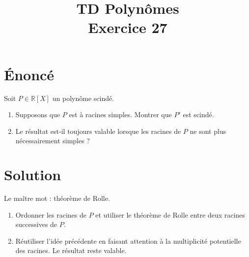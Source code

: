 \documentclass[french]{article}
\title{TD Polynômes \\ Exercice 27}
\date{}
\newcommand{\R}{\mathbb{R}}
\begin{document}
\maketitle

\section{Énoncé}
Soit $P \in \R[X]$ un polynôme scindé.
\begin{enumerate}
	\item Supposons que $P$ est à racines simples. Montrer que $P'$ est scindé.
	\item Le résultat est-il toujours valable lorsque les racines de $P$ ne sont plus nécessairement simples ?
\end{enumerate}
\section{Solution}
Le maître mot : théorème de Rolle. 
\begin{enumerate}
	\item Ordonner les racines de $P$ et utiliser le théorème de Rolle entre deux racines successives de $P$.
	\item Réutiliser l'idée précédente en faisant attention à la multiplicité potentielle des racines. Le résultat reste valable.
\end{enumerate}
\end{document}
